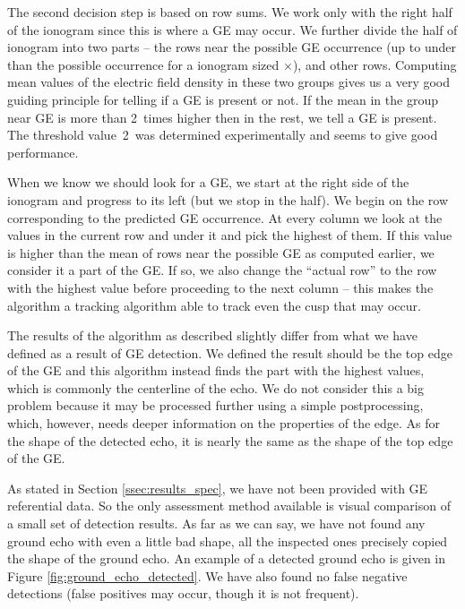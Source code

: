 The second decision step is based on row sums. We work only with the right half of the ionogram since this is where a GE may occur. We further divide the half of ionogram into two parts -- the rows near the possible GE occurrence (up to  under than the possible occurrence for a ionogram sized $\times$), and other rows. Computing mean values of the electric field density in these two groups gives us a very good guiding principle for telling if a GE is present or not. If the mean in the group near GE is more than 2~times higher then in the rest, we tell a GE is present. The threshold value~2~was determined experimentally and seems to give good performance.

When we know we should look for a GE, we start at the right side of the ionogram and progress to its left (but we stop in the half). We begin on the row corresponding to the predicted GE occurrence. At every column we look at the values in the current row and  under it and pick the highest of them. If this value is higher than the mean of rows near the possible GE as computed earlier, we consider it a part of the GE. If so, we also change the ``actual row'' to the row with the highest value before proceeding to the next column -- this makes the algorithm a tracking algorithm able to track even the cusp that may occur.

The results of the algorithm as described slightly differ from what we have defined as a result of GE detection. We defined the result should be the top edge of the GE and this algorithm instead finds the part with the highest values, which is commonly the centerline of the echo. We do not consider this a big problem because it may be processed further using a simple postprocessing, which, however, needs deeper information on the properties of the edge. As for the shape of the detected echo, it is nearly the same as the shape of the top edge of the GE.

As stated in Section \ref{ssec:results_spec}, we have not been provided with GE referential data. So the only assessment method available is visual comparison of a small set of detection results. As far as we can say, we have not found any ground echo with even a little bad shape, all the inspected ones precisely copied the shape of the ground echo. An example of a detected ground echo is given in Figure \ref{fig:ground_echo_detected}. We have also found no false negative detections (false positives may occur, though it is not frequent).

